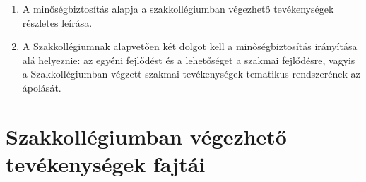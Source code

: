 \documentclass[12pt]{report}
\begin{document}
\begin{enumerate}
  \item A minőségbiztosítás alapja a szakkollégiumban végezhető tevékenységek részletes leírása.
  \item A Szakkollégiumnak alapvetően két dolgot kell a minőségbiztosítás irányítása alá helyeznie: az egyéni fejlődést és a lehetőséget a szakmai fejlődésre,
    vagyis a Szakkollégiumban végzett szakmai tevékenységek tematikus rendszerének az ápolását.
\end{enumerate}

\section{Szakkollégiumban végezhető tevékenységek fajtái} \label{sec_quality_activities}
\end{document}
